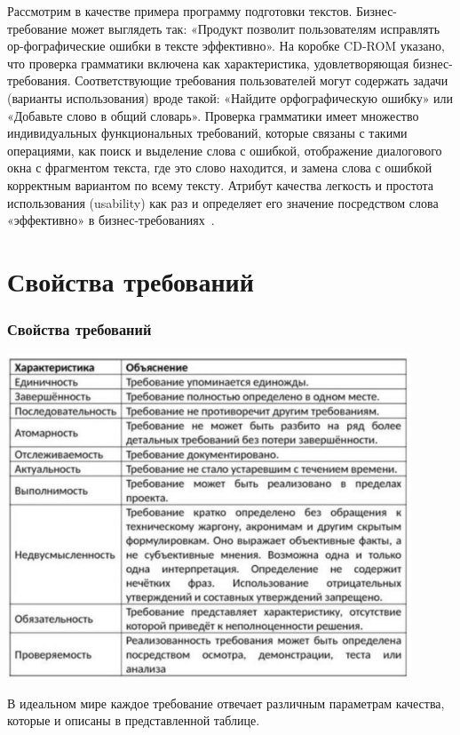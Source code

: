 \documentclass{../industrial-development}
\begin{document}
\lecturenotes

Рассмотрим в качестве примера программу подготовки текстов. Бизнес-требование может выглядеть так: «Продукт позволит пользователям исправлять ор-фографические ошибки в тексте эффективно». На коробке CD-ROM указано, что проверка грамматики включена как характеристика, удовлетворяющая бизнес-требования. Соответствующие требования пользователей могут содержать задачи (варианты использования) вроде такой: «Найдите орфографическую ошибку» или «Добавьте слово в общий
словарь». Проверка грамматики имеет множество индивидуальных функциональных требований, которые связаны с такими операциями, как поиск и выделение слова с ошибкой, отображение диалогового окна
с фрагментом текста, где это слово находится, и замена слова с ошибкой корректным вариантом по всему тексту. Атрибут качества легкость и простота использования (usability) как раз и определяет его значение посредством слова «эффективно» в бизнес-требованиях~\cite[с.~10--11]{Wiegers}.



\section{Свойства требований}
\begin{frame} \frametitle{Свойства требований}
  \centerline{\includegraphics[width=0.9\textwidth]{pict2.pdf}}
\end{frame}

\lecturenotes

В идеальном мире каждое требование отвечает различным параметрам качества, которые и описаны в представленной таблице.
\end{document}
